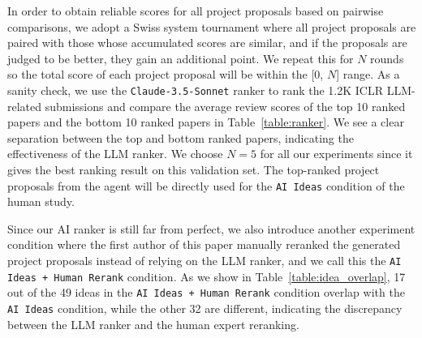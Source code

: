 In order to obtain reliable scores for all project proposals based on pairwise comparisons, we adopt a Swiss system tournament where all project proposals are paired with those whose accumulated scores are similar, and if the proposals are judged to be better, they gain an additional point. We repeat this for $N$ rounds so the total score of each project proposal will be within the [0, $N$] range. As a sanity check, we use the \texttt{Claude-3.5-Sonnet} ranker to rank the 1.2K ICLR LLM-related submissions and compare the average review scores of the top 10 ranked papers and the bottom 10 ranked papers in Table~\ref{table:ranker}. We see a clear separation between the top and bottom ranked papers, indicating the effectiveness of the LLM ranker. We choose $N = 5$ for all our experiments since it gives the best ranking result on this validation set. 
%
The top-ranked project proposals from the agent will be directly used for the \texttt{AI Ideas} condition of the human study. 

Since our AI ranker is still far from perfect, we also introduce another experiment condition where the first author of this paper manually reranked the generated project proposals instead of relying on the LLM ranker, and we call this the \texttt{AI Ideas + Human Rerank} condition.
As we show in Table~\ref{table:idea_overlap}, 17 out of the 49 ideas in the \texttt{AI Ideas + Human Rerank} condition overlap with the \texttt{AI Ideas} condition, while the other 32 are different, indicating the discrepancy between the LLM ranker and the human expert reranking. 







